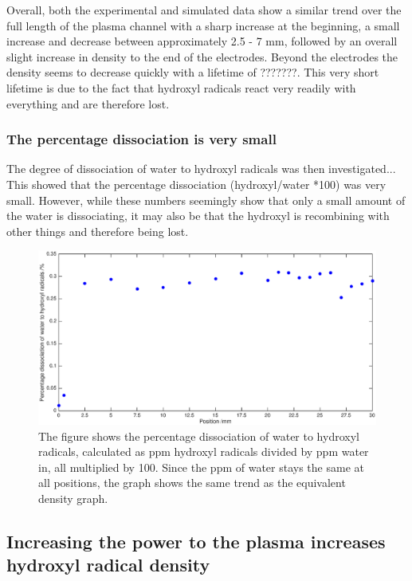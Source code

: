 \documentclass[11pt, oneside]{article}   	%
\begin{document}
Overall, both the experimental and simulated data show a similar trend over the full length of the plasma channel with a sharp increase at the beginning, a small increase and decrease between approximately 2.5 - 7 mm, followed by an overall slight increase in density to the end of the electrodes.
Beyond the electrodes the density seems to decrease quickly with a lifetime of ???????.
This very short lifetime is due to the fact that hydroxyl radicals react very readily with everything and are therefore lost.


\subsubsection{The percentage dissociation is very small}

The degree of dissociation of water to hydroxyl radicals was then investigated... 
This showed that the percentage dissociation (hydroxyl/water *100) was very small.
However, while these numbers seemingly show that only a small amount of the water is dissociating, it may also be that the hydroxyl is recombining with other things and therefore being lost.

\begin{figure}
	\centering
	\includegraphics[width=\textwidth]{Figures/SpatialDissociation2.eps}
	\caption{The figure shows the percentage dissociation of water to hydroxyl radicals, calculated as ppm hydroxyl radicals divided by ppm water in, all multiplied by 100. Since the ppm of water stays the same at all positions, the graph shows the same trend as the equivalent density graph.}
	\label{fig:SpatialDissociation}
\end{figure}


\subsection{Increasing the power to the plasma increases hydroxyl radical density}
\end{document}
